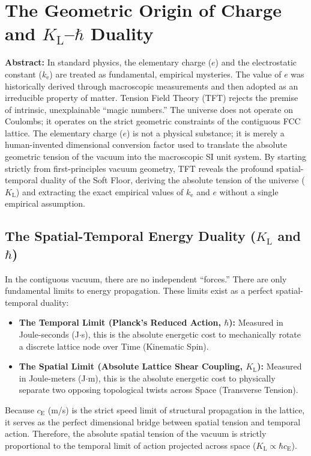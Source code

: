 \chapter{The Geometric Origin of Charge and $K_{\mathrm{L}}$--$\hbar$ Duality}
\label{app:origin_of_charge}

\noindent\textbf{Abstract:} In standard physics, the elementary charge ($e$) and the electrostatic constant ($k_{\mathrm{e}}$) are treated as fundamental, empirical mysteries. The value of $e$ was historically derived through macroscopic measurements and then adopted as an irreducible property of matter. Tension Field Theory (TFT) rejects the premise of intrinsic, unexplainable ``magic numbers.'' The universe does not operate on Coulombs; it operates on the strict geometric constraints of the contiguous FCC lattice. The elementary charge ($e$) is not a physical substance; it is merely a human-invented dimensional conversion factor used to translate the absolute geometric tension of the vacuum into the macroscopic SI unit system. By starting strictly from first-principles vacuum geometry, TFT reveals the profound spatial-temporal duality of the Soft Floor, deriving the absolute tension of the universe ($K_{\mathrm{L}}$) and extracting the exact empirical values of $k_{\mathrm{e}}$ and $e$ without a single empirical assumption.

\section{The Spatial-Temporal Energy Duality ($K_{\mathrm{L}}$ and $\hbar$)}
In the contiguous vacuum, there are no independent ``forces.'' There are only fundamental limits to energy propagation. These limits exist as a perfect spatial-temporal duality:
\begin{itemize}
    \item \textbf{The Temporal Limit (Planck's Reduced Action, $\hbar$):} Measured in Joule-seconds (J$\cdot$s), this is the absolute energetic cost to mechanically rotate a discrete lattice node over Time (Kinematic Spin).
    \item \textbf{The Spatial Limit (Absolute Lattice Shear Coupling, $K_{\mathrm{L}}$):} Measured in Joule-meters (J$\cdot$m), this is the absolute energetic cost to physically separate two opposing topological twists across Space (Transverse Tension).
\end{itemize}

Because $c_{\mathrm{E}}$ (m/s) is the strict speed limit of structural propagation in the lattice, it serves as the perfect dimensional bridge between spatial tension and temporal action. Therefore, the absolute spatial tension of the vacuum is strictly proportional to the temporal limit of action projected across space ($K_{\mathrm{L}} \propto \hbar c_{\mathrm{E}}$).

